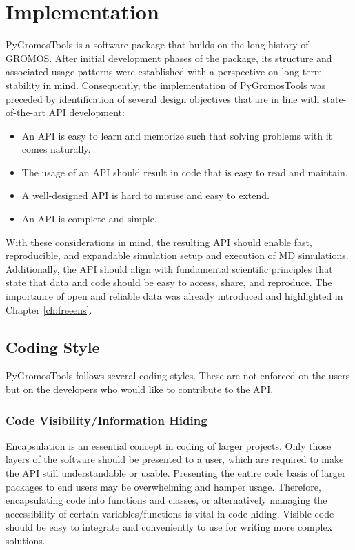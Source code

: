 \section{Implementation}
PyGromosTools is a software package that builds on the long history of GROMOS. After initial development phases of the package, its structure and associated usage patterns were established with a perspective on long-term stability in mind. Consequently, the implementation of PyGromosTools was preceded by identification of several design objectives that are in line with state-of-the-art API development: \cite{Henning2009, Blanchette2008, Bloch2006}
%
\begin{itemize}
    \item An API is easy to learn and memorize such that solving problems with it comes naturally. 
    \item The usage of an API should result in code that is easy to read and maintain.
    \item A well-designed API is hard to misuse and easy to extend.
    \item An API is complete and simple. 
\end{itemize}
%
With these considerations in mind, the resulting API should enable fast, reproducible, and expandable simulation setup and execution of MD simulations. Additionally, the API should align with fundamental scientific principles that state that data and code should be easy to access, share, and reproduce. The importance of open and reliable data was already introduced and highlighted in Chapter \ref{ch:freeens}.

\subsection{Coding Style}
PyGromosTools follows several coding styles. These are not enforced on the users but on the developers who would like to contribute to the API. 

\subsubsection{Code Visibility/Information Hiding}
Encapsulation is an essential concept in coding of larger projects. Only those layers of the software should be presented to a user, which are required to make the API still understandable or usable. Presenting the entire code basis of larger packages to end users may be overwhelming and hamper usage. Therefore, encapsulating code into functions and classes, or alternatively managing the accessibility of certain variables/functions is vital in code hiding.\cite{Leino2002, Ganney2020} Visible code should be easy to integrate and conveniently to use for writing more complex solutions.

